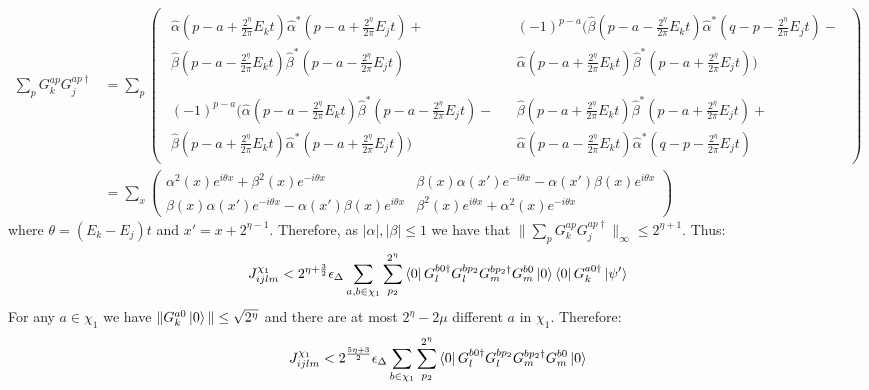 \documentclass[aps,floatfix,10pt,amssymb,amsfont,amsmath,superscriptaddress,float,nofootinbib,longbibliography,nobalancelastpage,twocolumn]{revtex4-2}
\begin{document}
\begin{align}
    \sum_{p}G_k^{ap}G_j^{ap\dagger} &=\sum_{p}\begin{pmatrix}
        \substack{\hat\alpha(p-a+\frac{2^{\eta}}{2\pi}E_kt)\hat\alpha^*(p-a+\frac{2^{\eta}}{2\pi}E_jt) +\\ \hat\beta(p-a-\frac{2^{\eta}}{2\pi}E_kt)\hat\beta^*(p-a-\frac{2^{\eta}}{2\pi}E_jt)} & \substack{(-1)^{p-a}(\hat\beta(p-a-\frac{2^{\eta}}{2\pi}E_kt)\hat\alpha^*(q-p-\frac{2^{\eta}}{2\pi}E_jt)-\\\hat\alpha(p-a+\frac{2^{\eta}}{2\pi}E_kt)\hat\beta^* (p-a+\frac{2^{\eta}}{2\pi}E_jt))}\\\\
        \substack{(-1)^{p-a}(\hat\alpha(p-a-\frac{2^{\eta}}{2\pi}E_kt)\hat\beta^*(p-a-\frac{2^{\eta}}{2\pi}E_jt)-\\\hat\beta (p-a+\frac{2^{\eta}}{2\pi}E_kt)\hat\alpha^*(p-a+\frac{2^{\eta}}{2\pi}E_jt))} & \substack{\hat\beta (p-a+\frac{2^{\eta}}{2\pi}E_kt)\hat\beta^* (p-a+\frac{2^{\eta}}{2\pi}E_jt) +
        \\\hat\alpha(p-a-\frac{2^{\eta}}{2\pi}E_kt)\hat\alpha^*(q-p-\frac{2^{\eta}}{2\pi}E_jt)}
    \end{pmatrix}\\
    &= \sum_x \begin{pmatrix}\alpha^2(x)e^{i\theta x} + \beta^2(x)e^{-i\theta x} & \beta(x)\alpha(x')e^{-i\theta x} - \alpha(x')\beta(x)e^{i\theta x}\\
    \beta(x)\alpha(x')e^{-i\theta x} - \alpha(x')\beta(x)e^{i\theta x} & \beta^2(x)e^{i\theta x} + \alpha^2(x)e^{-i\theta x}
    \end{pmatrix}
\end{align}
where $\theta = (E_k - E_j)t$ and $x' = x+2^{\eta-1}$. Therefore, as $|\alpha|, |\beta| \leq 1$ we have that $\|\sum_{p}G_k^{ap}G_j^{ap\dagger}\|_{\infty} \leq 2^{\eta+1}$. Thus:
\begin{equation}
    J_{ijlm}^{\chi_1} < 2^{\eta+\frac{3}{2}}\epsilon_{\Delta} \sum_{a,b\in \chi_1} \sum_{p_2}^{2^{\eta}}\bra{0} G^{b0\dagger}_lG^{bp_2}_lG^{bp_2\dagger}_mG^{b0}_m\ket{0}
    \bra{0}G_k^{a0\dagger}\ket{\psi'} 
\end{equation}
For any $a \in \chi_1$ we have $\|G_k^{a0}\ket{0}\| \leq \sqrt{2^{\eta}}$ and there are at most $2^{\eta} - 2\mu$ different $a$ in $\chi_1$. Therefore:
\begin{equation}
    J_{ijlm}^{\chi_1} < 2^{\frac{5 \eta + 3}{2}}\epsilon_{\Delta} \sum_{b \in \chi_1} \sum_{p_2}^{2^{\eta}}\bra{0} G^{b0\dagger}_lG^{bp_2}_lG^{bp_2\dagger}_mG^{b0}_m\ket{0}
\end{equation}
\end{document}
